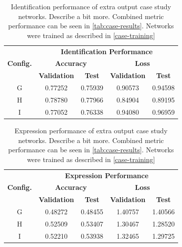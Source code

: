 \begin{table}[h!]
\begin{center}
\begin{tabular}{|c|c|c|c|c|}
\hline
\multirow{3}{*}{\textbf{Config.}} & \multicolumn{4}{|c|}{\textbf{Identification Performance}} \\ \cline{2-5}
& \multicolumn{2}{|c|}{\textbf{Accuracy}} & \multicolumn{2}{|c|}{\textbf{Loss}} \\ \cline{2-5}
& \textbf{Validation} & \textbf{Test} & \textbf{Validation} & \textbf{Test} \\ \hline
G & 0.77252 & 0.75939 & 0.90573 & 0.94598 \\ \hline
H & 0.78780 & 0.77966 & 0.84904 & 0.89195 \\ \hline
I & 0.77052 & 0.76338 & 0.94080 & 0.96959 \\ \hline
\end{tabular}
\end{center}
\caption[Identification performance of extra output case study networks]{Identification performance of extra output case study networks. Describe a bit more. Combined metric performance can be seen in \autoref{tab:case-results}. Networks were trained as described in \autoref{case-training}}
\label{tab:case-results-id}
\end{table}


\begin{table}[h!]
\begin{center}
\begin{tabular}{|c|c|c|c|c|}
\hline
\multirow{3}{*}{\textbf{Config.}} & \multicolumn{4}{|c|}{\textbf{Expression Performance}} \\ \cline{2-5}
& \multicolumn{2}{|c|}{\textbf{Accuracy}} & \multicolumn{2}{|c|}{\textbf{Loss}} \\ \cline{2-5}
& \textbf{Validation} & \textbf{Test} & \textbf{Validation} & \textbf{Test} \\ \hline
G & 0.48272 & 0.48455 & 1.40757 & 1.40566 \\ \hline
H & 0.52509 & 0.53407 & 1.30467 & 1.28520 \\ \hline
I & 0.52210 & 0.53938 & 1.32465 & 1.29725 \\ \hline
\end{tabular}
\end{center}
\caption[Expression performance of extra output case study networks]{Expression performance of extra output case study networks. Describe a bit more. Combined metric performance can be seen in \autoref{tab:case-results}. Networks were trained as described in \autoref{case-training}}
\label{tab:case-results-exp}
\end{table}

